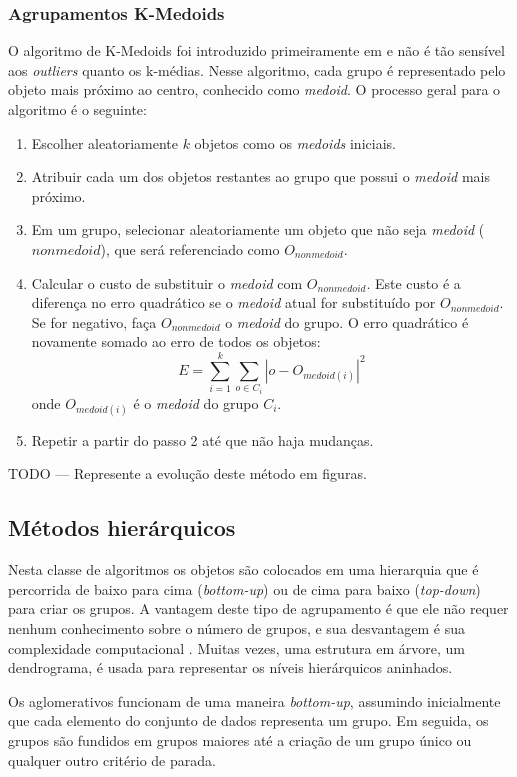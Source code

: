 \subsubsection{Agrupamentos K-Medoids}
O algoritmo de K-Medoids foi introduzido primeiramente em \cite{kaufmann1990} e não é tão sensível aos \textit{outliers} quanto os k-médias. Nesse algoritmo, cada grupo é representado pelo objeto mais próximo ao centro, conhecido como \textit{medoid}.
O processo geral para o algoritmo é o seguinte:
 \begin{enumerate}
 	\item Escolher aleatoriamente ${k}$ objetos como os \textit{medoids} iniciais.
 	\item Atribuir cada um dos objetos restantes ao grupo que possui o \textit{medoid} mais próximo.
 	\item Em um grupo, selecionar aleatoriamente um objeto que não seja \textit{medoid} (${nonmedoid}$), que será referenciado como ${O_{nonmedoid}}$.
 	\item Calcular o custo de substituir o \textit{medoid} com ${O_{nonmedoid}}$. Este custo é a diferença no erro quadrático se o \textit{medoid} atual for substituído por ${O_{nonmedoid}}$. Se for negativo, faça ${O_{nonmedoid}}$ o \textit{medoid} do grupo. O erro quadrático é novamente somado ao erro de todos os objetos:
 	\begin{equation}
 	E = \sum_{i=1}^{k}\sum_{o\in C_{i}} |o - O_{medoid(i)}|^{2}
 	\end{equation}
 	onde ${O_{medoid(i)}}$ é o \textit{medoid} do grupo ${C_{i}}$.
 	\item Repetir a partir do passo 2 até que não haja mudanças. 
 \end{enumerate}
TODO --- Represente a evolução deste método em figuras.

\subsection{Métodos hierárquicos}
Nesta classe de algoritmos os objetos são colocados em uma hierarquia que é percorrida de baixo para cima (\textit{bottom-up}) ou de cima para baixo (\textit{top-down}) para criar os grupos. A vantagem deste tipo de agrupamento é que ele não requer nenhum conhecimento sobre o número de grupos, e sua desvantagem é sua complexidade computacional \cite{Lin2004}. Muitas vezes, uma estrutura em árvore, um dendrograma, é usada para representar os níveis hierárquicos aninhados.

Os aglomerativos funcionam de uma maneira \textit{bottom-up},
assumindo inicialmente que cada elemento do conjunto de dados representa um grupo. Em seguida, os grupos são fundidos em grupos maiores até a criação de um grupo único ou qualquer outro critério de parada.

